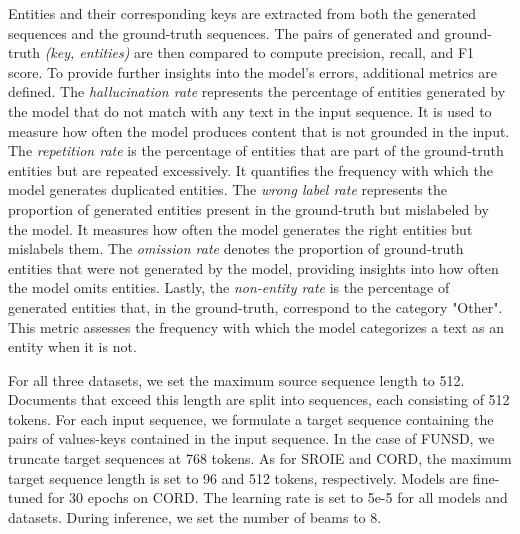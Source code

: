 Entities and their corresponding keys are extracted from both the generated sequences and the ground-truth sequences. The pairs of generated and ground-truth \textit{(key, entities)} are then compared to compute precision, recall, and F1 score. To provide further insights into the model's errors, additional metrics are defined. The \textit{hallucination rate} represents the percentage of entities generated by the model that do not match with any text in the input sequence. It is used to measure how often the model produces content that is not grounded in the input. The \textit{repetition rate} is the percentage of entities that are part of the ground-truth entities but are repeated excessively. It quantifies the frequency with which the model generates duplicated entities. The \textit{wrong label rate} represents the proportion of generated entities present in the ground-truth but mislabeled by the model. It measures how often the model generates the right entities but mislabels them. The \textit{omission rate} denotes the proportion of ground-truth entities that were not generated by the model, providing insights into how often the model omits entities. Lastly, the \textit{non-entity rate} is the percentage of generated entities that, in the ground-truth, correspond to the category "Other". This metric assesses the frequency with which the model categorizes a text as an entity when it is not.


For all three datasets, we set the maximum source sequence length to 512. Documents that exceed this length are split into sequences, each consisting of 512 tokens. For each input sequence, we formulate a target sequence containing the pairs of values-keys contained in the input sequence. In the case of FUNSD, we truncate target sequences at 768 tokens. As for SROIE and CORD, the maximum target sequence length is set to 96 and 512 tokens, respectively. Models are fine-tuned for 30 epochs on CORD. The learning rate is set to 5e-5 for all models and datasets. During inference, we set the number of beams to 8.


